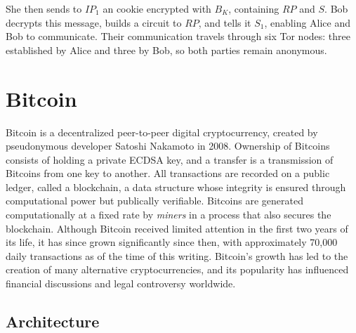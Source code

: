 She then sends to $IP_{1}$ an cookie encrypted with $B_{K}$, containing $RP$ and $S$. Bob decrypts this message, builds a circuit to $RP$, and tells it $S_{1}$, enabling Alice and Bob to communicate. Their communication travels through six Tor nodes: three established by Alice and three by Bob, so both parties remain anonymous.





\section{Bitcoin} 

Bitcoin is a decentralized peer-to-peer digital cryptocurrency, created by pseudonymous developer Satoshi Nakamoto in 2008. Ownership of Bitcoins consists of holding a private ECDSA key, and a transfer is a transmission of Bitcoins from one key to another. All transactions are recorded on a public ledger, called a blockchain, a data structure whose integrity is ensured through computational power but publically verifiable. Bitcoins are generated computationally at a fixed rate by \textit{miners} in a process that also secures the blockchain. Although Bitcoin received limited attention in the first two years of its life, it has since grown significantly since then, with approximately 70,000 daily transactions as of the time of this writing. Bitcoin's growth has led to the creation of many alternative cryptocurrencies, and its popularity has influenced financial discussions and legal controversy worldwide.

\subsection{Architecture}

